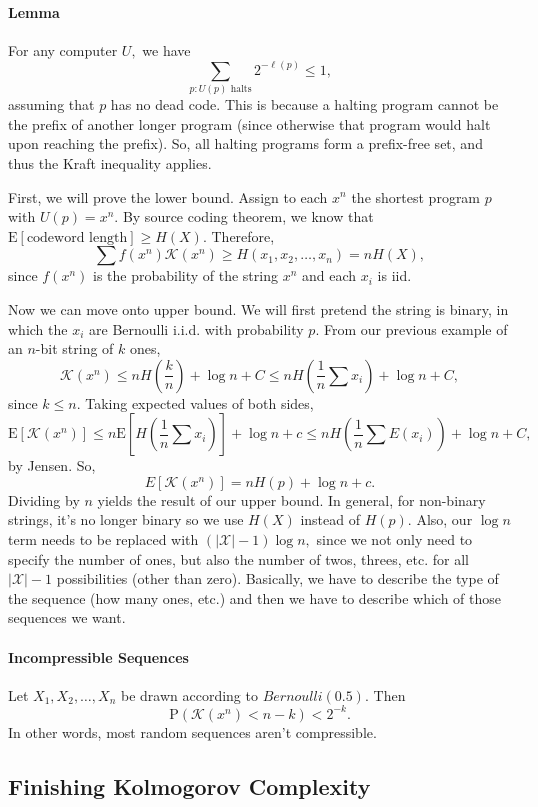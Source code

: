 \documentclass[12pt]{article}
\theoremstyle{remark}
\begin{document}
\paragraph{Lemma}
For any computer $U,$ we have
\[\sum_{p:U(p) \text{ halts}}2^{-\ell(p)}\le 1,\] assuming that $p$ has no dead code. This is because a halting program cannot be the prefix of another longer program (since otherwise that program would halt upon reaching the prefix). So, all halting programs form a prefix-free set, and thus the Kraft inequality applies.

First, we will prove the lower bound.
Assign to each $x^n$ the shortest program $p$ with $U(p)=x^n.$ By source coding theorem, we know that
$\mathrm{E}[\text{codeword length}]\ge H(X).$ Therefore, 
\[\sum f(x^n)\mathcal{K}(x^n)\ge H(x_1,x_2,\dots,x_n)=nH(X),\] since $f(x^n)$ is the probability of the string $x^n$ and each $x_i$ is iid.


Now we can move onto upper bound. We will first pretend the string is binary, in which the $x_i$ are Bernoulli i.i.d. with probability $p.$ From our previous example of an $n$-bit string of $k$ ones,
\[\mathcal{K}(x^n)\le nH\left(\frac{k}{n}\right)+\log n+C\le n H\left(\frac{1}{n}\sum x_i\right)+\log n +C,\] since $k\le n.$ 
Taking expected values of both sides,
\[\mathrm{E}[\mathcal{K}(x^n)]\le n\mathrm{E}\left[H\left(\frac{1}{n}\sum x_i\right)\right]+\log n+ c\le nH\left(\frac{1}{n}\sum E(x_i)\right)+\log n + C,\] by Jensen. So,
\[E[\mathcal{K}(x^n)]=nH(p)+\log n+c.\] Dividing by $n$ yields the result of our upper bound. In general, for non-binary strings, it's no longer binary so we use $H(X)$ instead of $H(p).$ Also, our $\log n $ term needs to be replaced with $(|\mathcal{X}|-1)\log n,$ since we not only need to specify the number of ones, but also the number of twos, threes, etc. for all $|\mathcal{X}|-1$ possibilities (other than zero). Basically, we have to describe the type of the sequence (how many ones, etc.) and then we have to describe which of those sequences we want.
\paragraph{Incompressible Sequences}
Let $X_1,X_2,\dots,X_n$ be drawn according to $Bernoulli(0.5).$ Then
\[\mathrm{P}(\mathcal{K}(x^n)<n-k)<2^{-k}.\] In other words, most random sequences aren't compressible.
\subsection{Finishing Kolmogorov Complexity}
\end{document}
